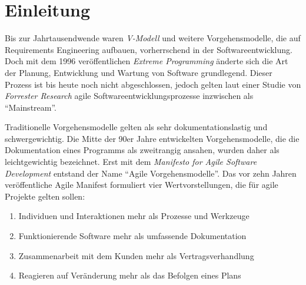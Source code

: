 \section{Einleitung}
\label{sec:einfuehrung}
Bis zur Jahrtausendwende waren \emph{V-Modell} und weitere Vorgehensmodelle, die auf Requirements Engineering aufbauen, vorherrschend in der Softwareentwicklung. Doch mit dem 1996 veröffentlichen \emph{Extreme Programming} änderte sich die Art der Planung, Entwicklung und Wartung von Software grundlegend. Dieser Prozess ist bis heute noch nicht abgeschlossen, jedoch gelten laut einer Studie von \emph{Forrester Research} agile Softwareentwicklungsprozesse inzwischen als ``Mainstream''. \cite{bib:ane}

Traditionelle Vorgehensmodelle gelten als sehr dokumentationslastig und schwergewichtig. Die Mitte der 90er Jahre entwickelten Vorgehensmodelle, die die Dokumentation eines Programms als zweitrangig ansahen, wurden daher als leichtgewichtig bezeichnet. Erst mit dem \emph{Manifesto for Agile Software Development} \cite{bib:manifest} entstand der Name ``Agile Vorgehensmodelle''. \cite{bib:eckstein} Das vor zehn Jahren veröffentliche Agile Manifest formuliert vier Wertvorstellungen, die für agile Projekte gelten sollen:
\begin{enumerate}
	\item Individuen und Interaktionen mehr als Prozesse und Werkzeuge
	\item Funktionierende Software mehr als umfassende Dokumentation
	\item Zusammenarbeit mit dem Kunden mehr als Vertragsverhandlung
	\item Reagieren auf Veränderung mehr als das Befolgen eines Plans
\end{enumerate}

